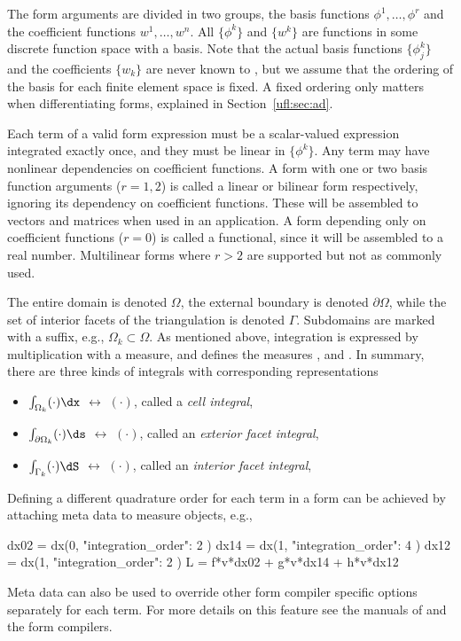 The form arguments are divided in two groups, the basis functions
$\phi^1,\ldots,\phi^r$ and the coefficient functions $w^1,\ldots,w^n$.
All $\{ \phi^k \}$ and $\{ w^k \}$ are functions in some discrete
function space with a basis.  Note that the actual basis functions $\{
\phi_j^k \}$ and the coefficients $\{ w_k \}$ are never known to
\ufl{}, but we assume that the ordering of the basis for each finite
element space is fixed. A fixed ordering only matters when
differentiating forms, explained in Section~\ref{ufl:sec:ad}.

Each term of a valid form expression must be a scalar-valued
expression integrated exactly once, and they must be linear in $\{
\phi^k \}$.  Any term may have nonlinear dependencies on coefficient
functions.  A form with one or two basis function arguments ($r=1,2$)
is called a linear or bilinear form respectively, ignoring its
dependency on coefficient functions. These will be assembled to
vectors and matrices when used in an application.  A form depending
only on coefficient functions ($r=0$) is called a functional, since it
will be assembled to a real number. Multilinear forms where $r > 2$
are supported but not as commonly used.

The entire domain is denoted $\Omega$, the external boundary is
denoted $\partial\Omega$, while the set of interior facets of the
triangulation is denoted $\Gamma$. Subdomains are marked with a
suffix, e.g., $\Omega_k \subset \Omega$. As mentioned above,
integration is expressed by multiplication with a measure, and \ufl{}
defines the measures ,  and .  In
summary, there are three kinds of integrals with corresponding \ufl{}
representations
\begin{itemize}
\item $\int_{        \Omega_k} (\cdot) \dx$ $\leftrightarrow$  $(\cdot)$, called a \emph{cell integral},
\item $\int_{\partial\Omega_k} (\cdot) \ds$ $\leftrightarrow$  $(\cdot)$, called an \emph{exterior facet integral},
\item $\int_{        \Gamma_k} (\cdot) \dS$ $\leftrightarrow$  $(\cdot)$, called an \emph{interior facet integral},
\end{itemize}
Defining a different quadrature order for each term in a form can be
achieved by attaching meta data to measure objects, e.g.,
\begin{python}
dx02 = dx(0, { "integration_order": 2 })
dx14 = dx(1, { "integration_order": 4 })
dx12 = dx(1, { "integration_order": 2 })
L = f*v*dx02 + g*v*dx14 + h*v*dx12
\end{python}
Meta data can also be used to override other form compiler specific
options separately for each term. For more details on this feature see
the manuals of \ufl{} and the form compilers.


